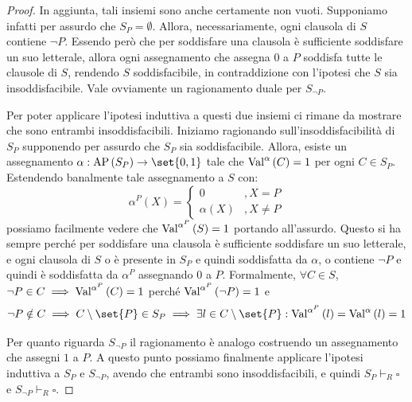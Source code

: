 \begin{proof}
  In aggiunta, tali insiemi sono anche certamente non vuoti. Supponiamo infatti per assurdo che \(S_P = \emptyset\). Allora, necessariamente, ogni clausola di \(S\) contiene \(\neg P\). Essendo però che per soddisfare una clausola è sufficiente soddisfare un suo letterale, allora ogni assegnamento che assegna \(0\) a \(P\) soddisfa tutte le clausole di \(S\), rendendo \(S\) soddisfacibile, in contraddizione con l'ipotesi che \(S\) sia insoddisfacibile. Vale ovviamente un ragionamento duale per \(S_{\neg P}\).

  Per poter applicare l'ipotesi induttiva a questi due insiemi ci rimane da mostrare che sono entrambi insoddisfacibili.
  Iniziamo ragionando sull'insoddisfacibilità di \(S_P\) supponendo per assurdo che \(S_P\) sia soddisfacibile. Allora, esiste un assegnamento \(\alpha: \AP[S_P] \to \set{0,1}\) tale che \(\Val{\alpha}[C] = 1\) per ogni \(C \in S_P\). Estendendo banalmente tale assegnamento a \(S\) con:
  \[\alpha^P(X) = \begin{cases}
    0 &, X=P\\
    \alpha(X) &, X\neq P
  \end{cases}\]
  possiamo facilmente vedere che \(\Val{\alpha^P}[S] = 1\) portando all'assurdo. Questo si ha sempre perché per soddisfare una clausola è sufficiente soddisfare un suo letterale, e ogni clausola di \(S\) o è presente in \(S_P\) e quindi soddisfatta da \(\alpha\), o contiene \(\neg P\) e quindi è soddisfatta da \(\alpha^P\) assegnando \(0\) a \(P\).
  Formalmente, \(\forall C \in S\), \(\neg P \in C \implies \Val{\alpha^P}[C] = 1\) perché \(\Val{\alpha^P}[\neg P] = 1\) e 
  \[\neg P \notin C \implies C\setminus\set{P} \in S_P \implies \exists l \in C\setminus\set{P} : \Val{\alpha^P}[l] = \Val{\alpha}[l] = 1\]

  Per quanto riguarda \(S_{\neg P}\) il ragionamento è analogo costruendo un assegnamento che assegni \(1\) a \(P\).
  A questo punto possiamo finalmente applicare l'ipotesi induttiva a \(S_P\) e \(S_{\neg P}\), avendo che entrambi sono insoddisfacibili, e quindi \(S_P\vdash_R \square\) e \(S_{\neg P}\vdash_R \square\).


\end{proof}
